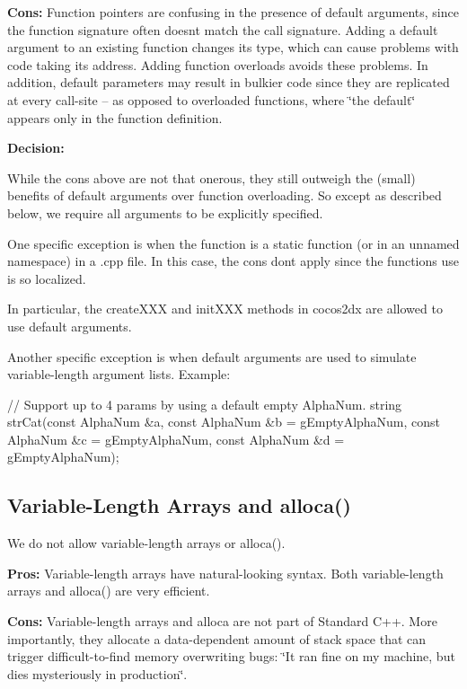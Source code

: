 {\bfseries Cons\+:} Function pointers are confusing in the presence of default arguments, since the function signature often doesn\textquotesingle{}t match the call signature. Adding a default argument to an existing function changes its type, which can cause problems with code taking its address. Adding function overloads avoids these problems. In addition, default parameters may result in bulkier code since they are replicated at every call-\/site -- as opposed to overloaded functions, where \char`\"{}the default\char`\"{} appears only in the function definition.

{\bfseries Decision\+:}

While the cons above are not that onerous, they still outweigh the (small) benefits of default arguments over function overloading. So except as described below, we require all arguments to be explicitly specified.

One specific exception is when the function is a static function (or in an unnamed namespace) in a .cpp file. In this case, the cons don\textquotesingle{}t apply since the function\textquotesingle{}s use is so localized.

In particular, the {\ttfamily create\+X\+XX} and {\ttfamily init\+X\+XX} methods in cocos2dx are allowed to use default arguments.

Another specific exception is when default arguments are used to simulate variable-\/length argument lists. Example\+:


\begin{DoxyCode}
\textcolor{comment}{// Support up to 4 params by using a default empty AlphaNum.}
\textcolor{keywordtype}{string} strCat(\textcolor{keyword}{const} AlphaNum &a,
              \textcolor{keyword}{const} AlphaNum &b = gEmptyAlphaNum,
              \textcolor{keyword}{const} AlphaNum &c = gEmptyAlphaNum,
              \textcolor{keyword}{const} AlphaNum &d = gEmptyAlphaNum);
\end{DoxyCode}


\subsection*{Variable-\/\+Length Arrays and alloca()}

We do not allow variable-\/length arrays or alloca().

{\bfseries Pros\+:} Variable-\/length arrays have natural-\/looking syntax. Both variable-\/length arrays and alloca() are very efficient.

{\bfseries Cons\+:} Variable-\/length arrays and alloca are not part of Standard C++. More importantly, they allocate a data-\/dependent amount of stack space that can trigger difficult-\/to-\/find memory overwriting bugs\+: \char`\"{}\+It ran fine on my machine, but dies mysteriously in production\char`\"{}.

